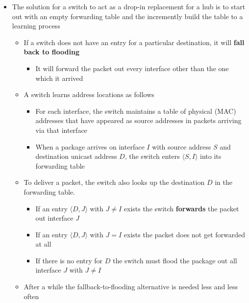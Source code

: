 \documentclass[11pt]{article}
\providecommand{\tightlist}{%
      \setlength{\itemsep}{0pt}\setlength{\parskip}{0pt}}
\begin{document}
\begin{itemize}
\tightlist
\item
  The solution for a switch to act as a drop-in replacement for a hub is
  to start out with an empty forwarding table and the incremently build
  the table to a learning process

  \begin{itemize}
  \tightlist
  \item
    If a switch does not have an entry for a particular destination, it
    will \textbf{fall back to flooding}

    \begin{itemize}
    \tightlist
    \item
      It will forward the packet out every interface other than the one
      which it arrived
    \end{itemize}
  \item
    A switch learns address locations as follows

    \begin{itemize}
    \tightlist
    \item
      For each interface, the switch maintains a table of physical (MAC)
      addresses that have appeared as source addresses in packets
      arriving via that interface
    \item
      When a package arrives on interface \(I\) with source address
      \(S\) and destination unicast address \(D\), the switch enters
      \(\langle S, I \rangle\) into its forwarding table
    \end{itemize}
  \item
    To deliver a packet, the switch also looks up the destination \(D\)
    in the forwarding table.

    \begin{itemize}
    \tightlist
    \item
      If an entry \(\langle D,J \rangle\) with \(J \ne I\) exists the
      switch \textbf{forwards} the packet out interface \(J\)
    \item
      If an entry \(\langle D,J \rangle\) with \(J = I\) exists the
      packet does not get forwarded at all
    \item
      If there is no entry for \(D\) the switch must flood the package
      out all interface \(J\) with \(J\ne I\)
    \end{itemize}
  \item
    After a while the fallback-to-flooding alternative is needed less
    and less often
  \end{itemize}
\end{itemize}
\end{document}
